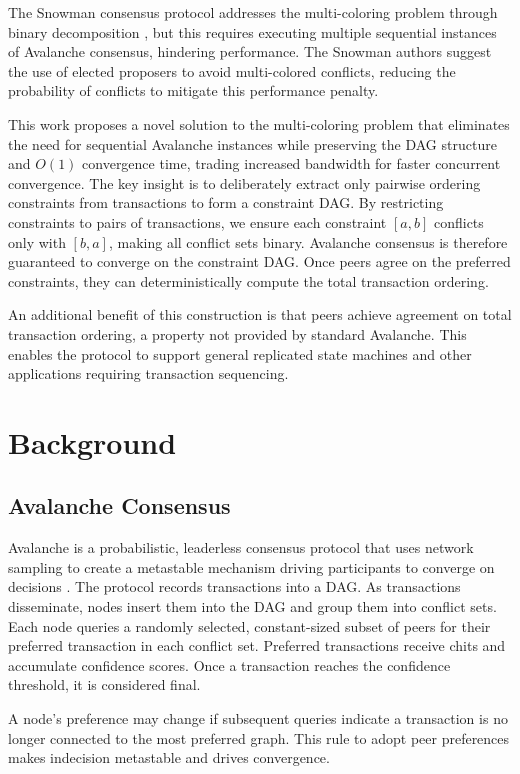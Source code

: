 \documentclass[12pt]{article}
\begin{document}
The Snowman consensus protocol addresses the multi-coloring problem through
binary decomposition \cite{buchwald2024frosty}, but this requires executing
multiple sequential instances of Avalanche consensus, hindering performance.
The Snowman authors suggest the use of elected proposers to avoid multi-colored
conflicts, reducing the probability of conflicts to mitigate this performance
penalty.

This work proposes a novel solution to the multi-coloring problem that
eliminates the need for sequential Avalanche instances while preserving the DAG
structure and $O(1)$ convergence time, trading increased bandwidth for faster
concurrent convergence. The key insight is to deliberately extract
only pairwise ordering constraints from transactions to form a constraint DAG.
By restricting constraints to pairs of transactions, we ensure each constraint
$[a,b]$ conflicts only with $[b,a]$, making all conflict sets binary. Avalanche
consensus is therefore guaranteed to converge on the constraint DAG. Once peers
agree on the preferred constraints, they can deterministically compute the
total transaction ordering.

An additional benefit of this construction is that peers achieve agreement on
total transaction ordering, a property not provided by standard Avalanche. This
enables the protocol to support general replicated state machines and other
applications requiring transaction sequencing.

\section{Background}
\subsection{Avalanche Consensus}
Avalanche is a probabilistic, leaderless consensus protocol that uses network
sampling to create a metastable mechanism driving participants to converge on
decisions \cite{rocket}. The protocol records transactions into a DAG. As
transactions disseminate, nodes insert them into the DAG and group them into
conflict sets. Each node queries a randomly selected, constant-sized subset of
peers for their preferred transaction in each conflict set. Preferred
transactions receive chits and accumulate confidence scores. Once a transaction
reaches the confidence threshold, it is considered final.

A node's preference may change if subsequent queries indicate a transaction is
no longer connected to the most preferred graph. This rule to adopt peer
preferences makes indecision metastable and drives convergence.
\end{document}
